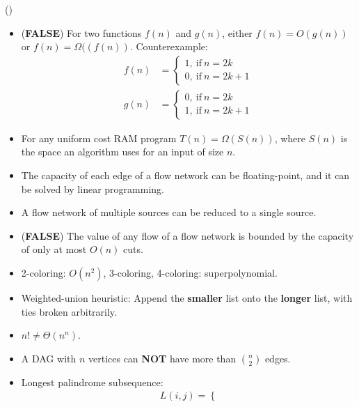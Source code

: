 \item \begin{theorem}{()} \quad\quad
    \begin{itemize}
        \item (\textbf{FALSE}) For two functions $f(n)$ and $g(n)$, either $f(n) = O(g(n))$ or $f(n) = \Omega((f(n))$.
        Counterexample:\begin{equation}
            \begin{aligned}
                f(n) & = \begin{cases}
                    1, \ \text{if} \ n = 2k \\
                    0, \ \text{if} \ n = 2k + 1
                \end{cases} \\
                g(n) & = \begin{cases}
                    0, \ \text{if} \ n = 2k \\
                    1, \ \text{if} \ n = 2k + 1
                \end{cases} 
            \end{aligned}
        \end{equation}
        \item For any uniform cost RAM program $T(n) = \Omega(S(n))$, where $S(n)$ is the space an algorithm uses for an input of size $n$.
        \item The capacity of each edge of a flow network can be floating-point, and it can be solved by linear programming.
        \item A flow network of multiple sources can be reduced to a single source.
        \item (\textbf{FALSE}) The value of any flow of a flow network is bounded by the capacity of only at most $O(n)$ cuts.
        \item 2-coloring: $O(n^2)$, 3-coloring, 4-coloring: superpolynomial.
        \item Weighted-union heuristic: Append the \textbf{smaller} list onto the \textbf{longer} list, with ties broken arbitrarily.
        \item $n! \neq \Theta(n^n)$.
        \item A DAG with $n$ vertices can \textbf{NOT} have more than $\binom{n}{2}$ edges.
        \item Longest palindrome subsequence: \begin{equation}
            \begin{aligned}
                & L(i, j) = \begin{cases}

\end{cases}
\end{aligned}
\end{equation}
\end{itemize}
\end{theorem}
